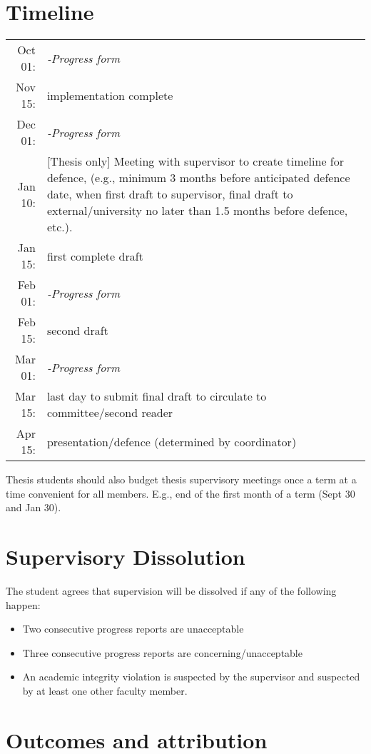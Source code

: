 \documentclass[12pt]{article}
\begin{document}
	\section{Timeline}
	\begin{tabular}{r p{}}
		Oct 01:& \emph{-Progress form}\\
		Nov 15:& implementation complete\\
		Dec 01:& \emph{-Progress form}\\
  		Jan 10:& [Thesis only] Meeting with supervisor to create timeline for defence, (e.g., minimum 3 months before anticipated defence date, when first draft to supervisor, final draft to external/university no later than 1.5 months before defence, etc.).\\
		Jan 15:& first complete draft\\
		Feb 01:& \emph{-Progress form}\\
		Feb 15:& second draft\\
		Mar 01:& \emph{-Progress form}\\
		Mar 15:& last day to submit final draft to circulate to committee/second reader\\
		Apr 15:& presentation/defence (determined by coordinator)\\
	\end{tabular}

Thesis students should also budget thesis supervisory  meetings once a term at a time convenient for all members. E.g., end of the first month of a term (Sept 30 and Jan 30).
	\section{Supervisory Dissolution}
	The student agrees that supervision will be dissolved if any of the following happen:
	\begin{itemize}
	\item Two consecutive progress reports are unacceptable
	\item Three consecutive progress reports are concerning/unacceptable
	\item An academic integrity violation is suspected by the supervisor and suspected by at least one other faculty member.
	\end{itemize}
	
	\section{Outcomes and attribution}
	
	
		
	
	
\end{document}
